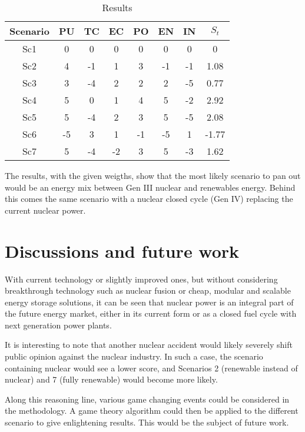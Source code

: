\documentclass[IJPHM, 2017, 29]{PHMSociety}
\begin{document}
\begin{table}[]
\centering
\caption{Results}
\label{tab3}
\begin{tabular}{|c|c|c|c|c|c|c|c|}
\hline
Scenario & PU & TC & EC & PO & EN & IN & $S_t$ \\ \hline
Sc1      & 0  & 0  & 0  & 0  & 0  & 0  & 0     \\ \hline
Sc2      & 4  & -1 & 1  & 3  & -1 & -1 & 1.08  \\ \hline
Sc3      & 3  & -4 & 2  & 2  & 2  & -5 & 0.77  \\ \hline
Sc4      & 5  & 0  & 1  & 4  & 5  & -2 & 2.92  \\ \hline
Sc5      & 5  & -4 & 2  & 3  & 5  & -5 & 2.08  \\ \hline
Sc6      & -5 & 3  & 1  & -1 & -5 & 1  & -1.77 \\ \hline
Sc7      & 5  & -4 & -2 & 3  & 5  & -3 & 1.62  \\ \hline
\end{tabular}
\end{table}


The results, with the given weigths, show that the most likely scenario to pan out would be an energy mix between Gen III nuclear and renewables energy. Behind this comes the same scenario with a nuclear closed cycle (Gen IV) replacing the current nuclear power.

\section{Discussions and future work}
\label{sec:fut}
With current technology or slightly improved ones, but without considering breakthrough technology such as nuclear fusion or cheap, modular and scalable energy storage solutions, it can be seen that nuclear power is an integral part of the future energy market, either in its current form or as a closed fuel cycle with next generation power plants.

It is interesting to note that another nuclear accident would likely severely shift public opinion against the nuclear industry. In such a case, the scenario containing nuclear would see a lower score, and Scenarios 2 (renewable instead of nuclear) and 7 (fully renewable) would become more likely.

Along this reasoning line, various game changing events could be considered in the methodology. A game theory algorithm could then be applied to the different scenario to give enlightening results. This would be the subject of future work.
\end{document}

